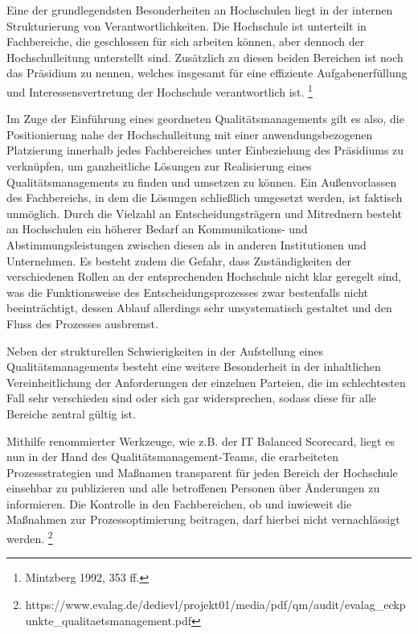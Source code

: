 \documentclass{article}
\begin{document}
\bigskip

Eine der grundlegendsten Besonderheiten an Hochschulen liegt in der internen Strukturierung von Verantwortlichkeiten.
Die Hochschule ist unterteilt in Fachbereiche, die geschlossen für sich arbeiten können, aber dennoch der
Hochschulleitung unterstellt sind. Zusätzlich zu diesen beiden Bereichen ist noch das Präsidium zu nennen, welches
insgesamt für eine effiziente Aufgabenerfüllung und Interessensvertretung der Hochschule verantwortlich ist.
\footnote{Mintzberg 1992, 353 ff. } 


\bigskip

Im Zuge der Einführung eines geordneten Qualitätsmanagements gilt es also, die Positionierung nahe der Hochschulleitung
mit einer anwendungsbezogenen Platzierung innerhalb jedes Fachbereiches unter Einbeziehung des Präsidiums zu
verknüpfen, um ganzheitliche Lösungen zur Realisierung eines Qualitätsmanagements zu finden und umsetzen zu können. Ein
Außenvorlassen des Fachbereichs, in dem die Lösungen schließlich umgesetzt werden, ist faktisch unmöglich. Durch die
Vielzahl an Entscheidungsträgern und Mitrednern besteht an Hochschulen ein höherer Bedarf an Kommunikations- und
Abstimmungsleistungen zwischen diesen als in anderen Institutionen und Unternehmen. Es besteht zudem die Gefahr, dass
Zuständigkeiten der verschiedenen Rollen an der entsprechenden Hochschule nicht klar geregelt sind, was die
Funktionsweise des Entscheidungsprozesses zwar bestenfalls nicht beeinträchtigt, dessen Ablauf allerdings sehr
unsystematisch gestaltet und den Fluss des Prozesses ausbremst.


\bigskip

Neben der strukturellen Schwierigkeiten in der Aufstellung eines Qualitätsmanagements besteht eine weitere Besonderheit
in der inhaltlichen Vereinheitlichung der Anforderungen der einzelnen Parteien, die im schlechtesten Fall sehr
verschieden sind oder sich gar widersprechen, sodass diese für alle Bereiche zentral gültig ist. 


\bigskip

Mithilfe renommierter Werkzeuge, wie z.B. der IT Balanced Scorecard, liegt es nun in der Hand des
Qualitätsmanagement-Teams, die erarbeiteten Prozessstrategien und Maßnamen transparent für jeden Bereich der Hochschule
einsehbar zu publizieren und alle betroffenen Personen über Änderungen zu informieren. Die Kontrolle in den
Fachbereichen, ob und inwieweit die Maßnahmen zur Prozessoptimierung beitragen, darf hierbei nicht vernachlässigt
werden.
\footnote{https://www.evalag.de/dedievl/projekt01/media/pdf/qm/audit/evalag\_eckpunkte\_qualitaetsmanagement.pdf}
\end{document}
